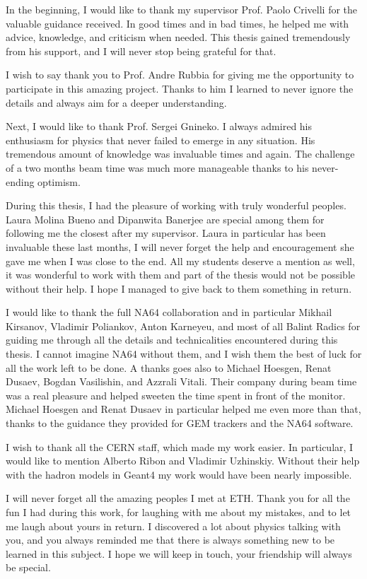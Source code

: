 In the beginning, I would like to thank my supervisor Prof. Paolo Crivelli for the valuable guidance received. In good times and in bad times, he helped me with advice, knowledge, and criticism when needed. This thesis gained tremendously from his support, and I will never stop being grateful for that. 

I wish to say thank you to Prof. Andre Rubbia for giving me the opportunity to participate in this amazing project. Thanks to him I learned to never ignore the details and always aim for a deeper understanding.

Next, I would like to thank Prof. Sergei Gnineko. I always admired his enthusiasm for physics that never failed to emerge in any situation. His tremendous amount of knowledge was invaluable times and again. The challenge of a two months beam time was much more manageable thanks to his never-ending optimism.

During this thesis, I had the pleasure of working with truly wonderful peoples. Laura Molina Bueno and Dipanwita Banerjee are special among them for following me the closest after my supervisor. Laura in particular has been invaluable these last months, I will never forget the help and encouragement she gave me when I was close to the end. All my students deserve a mention as well, it was wonderful to work with them and part of the thesis would not be possible without their help. I hope I managed to give back to them something in return.

I would like to thank the full NA64 collaboration and in particular Mikhail Kirsanov, Vladimir Poliankov, Anton Karneyeu, and most of all Balint Radics for guiding me through all the details and technicalities encountered during this thesis. I cannot imagine NA64 without them, and I wish them the best of luck for all the work left to be done. A thanks goes also to Michael Hoesgen, Renat Dusaev, Bogdan Vasilishin, and Azzrali Vitali. Their company during beam time was a real pleasure and helped sweeten the time spent in front of the monitor. Michael Hoesgen and Renat Dusaev in particular helped me even more than that, thanks to the guidance they provided for GEM trackers and the NA64 software.

I wish to thank all the CERN staff, which made my work easier. In particular, I would like to mention Alberto Ribon and Vladimir Uzhinskiy. Without their help with the hadron models in Geant4 my work would have been nearly impossible.

I will never forget all the amazing peoples I met at ETH. Thank you for all the fun I had during this work, for laughing with me about my mistakes, and to let me laugh about yours in return. I discovered a lot about physics talking with you, and you always reminded me that there is always something new to be learned in this subject. I hope we will keep in touch, your friendship will always be special.

